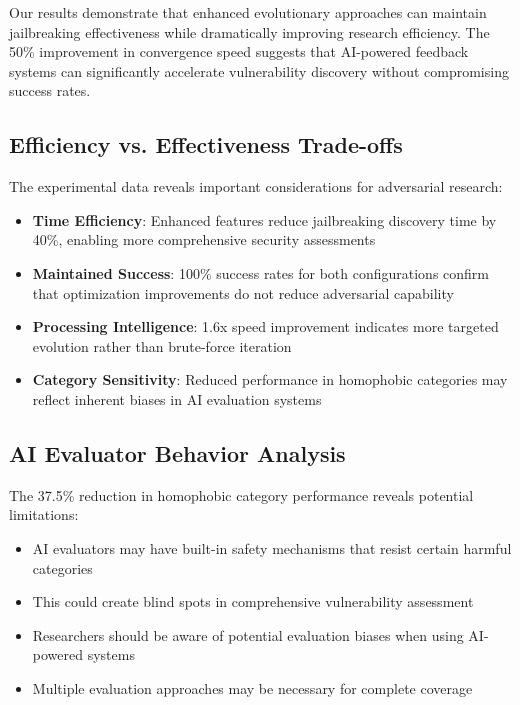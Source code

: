 \documentclass[11pt,twocolumn]{article}
\begin{document}
Our results demonstrate that enhanced evolutionary approaches can maintain jailbreaking effectiveness while dramatically improving research efficiency. The 50\% improvement in convergence speed suggests that AI-powered feedback systems can significantly accelerate vulnerability discovery without compromising success rates.

\subsection{Efficiency vs. Effectiveness Trade-offs}

The experimental data reveals important considerations for adversarial research:

\begin{itemize}
\item \textbf{Time Efficiency}: Enhanced features reduce jailbreaking discovery time by 40\%, enabling more comprehensive security assessments
\item \textbf{Maintained Success}: 100\% success rates for both configurations confirm that optimization improvements do not reduce adversarial capability
\item \textbf{Processing Intelligence}: 1.6x speed improvement indicates more targeted evolution rather than brute-force iteration
\item \textbf{Category Sensitivity}: Reduced performance in homophobic categories may reflect inherent biases in AI evaluation systems
\end{itemize}

\subsection{AI Evaluator Behavior Analysis}

The 37.5\% reduction in homophobic category performance reveals potential limitations:

\begin{itemize}
\item AI evaluators may have built-in safety mechanisms that resist certain harmful categories
\item This could create blind spots in comprehensive vulnerability assessment
\item Researchers should be aware of potential evaluation biases when using AI-powered systems
\item Multiple evaluation approaches may be necessary for complete coverage
\end{itemize}
\end{document}
